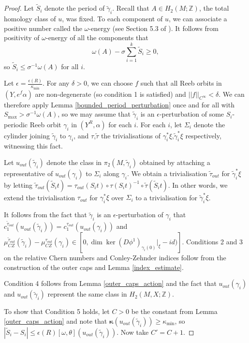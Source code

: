 \documentclass{article}
\numberwithin{equation}{section}
\numberwithin{figure}{section}
\begin{document}
\begin{proof}
Let $\tilde{S}_i$ denote the period of $\tilde{\gamma}_i$. Recall that $A\in H_2(M;\mathbb{Z})$, the total homology class of $u$, was fixed. To each component of $u$, we can associate a positive number called the $\omega$-energy (see Section 5.3 of \cite{Bou}). It follows from positivity of $\omega$-energy of all the components that
\begin{equation}
    \omega(A)-\sigma\sum_{i=1}^k\tilde{S}_i\geq 0,
    \label{omega_energy_estimate}
\end{equation}
so $\tilde{S}_i\leq \sigma^{-1}\omega(A)$ for all $i$. 

Let $\epsilon=\frac{\epsilon(R)}{\kappa_{\min}}$. For any $\delta>0$, we can choose $f$ such that all Reeb orbits in $(Y,e^f\alpha)$ are non-degenerate (so condition 1 is satisfied) and $||f||_{C^\infty}<\delta$. We can therefore apply Lemma \ref{bounded_period_perturbation} once and for all with $S_{\max}>\sigma^{-1}\omega(A)$, so we may assume that $\tilde{\gamma}_i$ is an $\epsilon$-perturbation of some $S_i$-periodic Reeb orbit $\gamma_i$ in $(Y^R,\alpha)$ for each $i$. For each $i$, let $\Sigma_i$ denote the cylinder joining $\tilde{\gamma}_i$ to $\gamma_i$, and $\tau$,$\tilde{\tau}$ the trivialisations of $\gamma_i^*\xi$,$\tilde{\gamma}_i^*\xi$ respectively, witnessing this fact. 

Let $u_{out}(\tilde{\gamma}_i)$ denote the class in $\pi_2(M,\tilde{\gamma}_i)$ obtained by attaching a representative of $u_{out}(\gamma_i)$ to $\Sigma_i$ along $\gamma_i$. We obtain a trivialisation $\tilde{\tau}_{out}$ for $\tilde{\gamma}_i^*\xi$ by letting $\tilde{\tau}_{out}(\tilde{S}_it)=\tau_{out}(S_it)\circ\tau(S_it)^{-1}\circ\tilde{\tau}(\tilde{S}_it)$. In other words, we extend the trivialisation $\tau_{out}$ for $\gamma_i^*\xi$ over $\Sigma_i$ to a trivialisation for $\tilde{\gamma}_i^*\xi$.

It follows from the fact that $\tilde{\gamma}_i$ is an $\epsilon$-perturbation of $\gamma_i$ that $c_1^{\tilde{\tau}_{out}}(u_{out}(\tilde{\gamma}_i))=c_1^{\tau_{out}}(u_{out}(\gamma_i))$ and $\mu_{CZ}^{\tilde{\tau}_{out}}(\tilde{\gamma}_i)-\mu_{CZ}^{\tau_{out}}(\gamma_i)\in [0,\dim\ker(D\phi^1)_{\gamma_i(0)}|_\xi-id)]$. Conditions 2 and 3 on the relative Chern numbers and Conley-Zehnder indices follow from the construction of the outer caps and Lemma \ref{index_estimate}.

Condition 4 follows from Lemma \ref{outer_caps_action} and the fact that $u_{out}(\gamma_i)$ and $u_{out}(\tilde{\gamma}_i)$ represent the same class in $H_2(M,X;\mathbb{Z})$. 

To show that Condition 5 holds, let $C>0$ be the constant from Lemma \ref{outer_caps_action} and note that $\pmb{\kappa}(u_{out}(\tilde{\gamma}_i))\geq \kappa_{\min}$, so $|\tilde{S}_i-S_i|\leq \epsilon(R)[\omega,\theta](u_{out}(\tilde{\gamma}_i))$. Now take $C'=C+1$.
\end{proof} 
\end{document}
